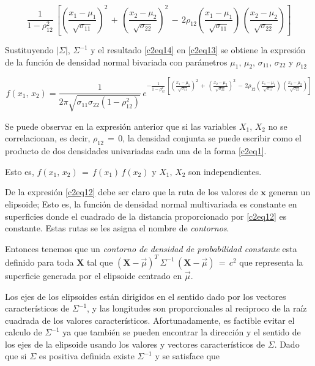 \documentclass[spanish]{report}
\begin{document}
\begin{equation}
\frac{1}{1-\rho^2_{12}}\,\left[\left(\frac{x_1-\mu_1}{\sqrt{\sigma_{11}}}\right)^2\,+\,\left(\frac{x_2-\mu_2}{\sqrt{\sigma_{22}}}\right)^2\,-\,2\rho_{12}\left(\frac{x_1-\mu_1}{\sqrt{\sigma_{11}}}\right)\,\left(\frac{x_2-\mu_2}{\sqrt{\sigma_{22}}}\right)\right]
\label{c2eq14}
\end{equation}

Sustituyendo $|\Sigma|$, $\Sigma^{-1}$ y el resultado \ref{c2eq14} en \ref{c2eq13} se obtiene la expresión de la función de densidad normal bivariada con parámetros $\mu_1,\,\mu_2,\,\sigma_{11},\,\sigma_{22}$ y $\rho_{12}$

\begin{equation}
f(x_1,\,x_2)= \frac{1}{2\pi\sqrt{\sigma_{11}\sigma_{22}(1-\rho^2_{12})}}\,e^{-\frac{1}{1-\rho^2_{12}}\,\left[\left(\frac{x_1-\mu_1}{\sqrt{\sigma_{11}}}\right)^2\,+\,\left(\frac{x_2-\mu_2}{\sqrt{\sigma_{22}}}\right)^2\,-\,2\rho_{12}\left(\frac{x_1-\mu_1}{\sqrt{\sigma_{11}}}\right)\,\left(\frac{x_2-\mu_2}{\sqrt{\sigma_{22}}}\right)\right]}
\label{c2eq15}
\end{equation}

Se puede observar en la expresión anterior que si las variables $X_1,\,X_2$ no se correlacionan, es decir, $\rho_{12}\,=\,0$, la densidad conjunta se puede escribir como el producto de dos densidades univariadas cada una de la forma \ref{c2eq1}.

Esto es, $f(x_1,\,x_2)\,=\,f(x_1)\,f(x_2)$ y $X_1,\,X_2$ son independientes.

De la expresión \ref{c2eq12} debe ser claro que la ruta de los valores de $\textbf{x}$ generan un elipsoide; Esto es, la función de densidad normal multivariada es constante en superficies donde el cuadrado de la distancia proporcionado por \ref{c2eq12} es constante. Estas rutas se les asigna el nombre de \emph{contornos}.

Entonces tenemos que un \emph{contorno de densidad de probabilidad constante} esta definido para toda $\textbf{X}$ tal que $(\textbf{X}-\vec{\mu})^T\,\Sigma^{-1}\,(\textbf{X}-\vec{\mu})\,=\,c^2$ que representa la superficie generada por el elipsoide centrado en $\vec{\mu}$.

Los ejes de los elipsoides están dirigidos en el sentido dado por los vectores característicos de $\Sigma^{-1}$, y las longitudes son proporcionales al reciproco de la raíz cuadrada de los valores característicos. Afortunadamente, es factible evitar el calculo de $\Sigma^{-1}$ ya que también se pueden encontrar la dirección y el sentido de los ejes de la elipsoide usando los valores y vectores característicos de $\Sigma$. Dado que si $\Sigma$ es positiva definida existe $\Sigma^{-1}$ y se satisface que
\end{document}
